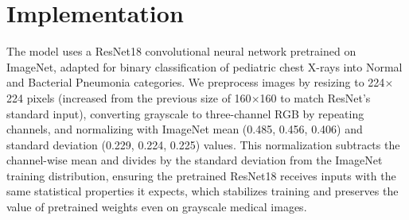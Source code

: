 \documentclass[11pt]{article}
\begin{document}





\section{Implementation}



The model uses a ResNet18 convolutional neural network pretrained on ImageNet, adapted for binary classification of pediatric chest X-rays into Normal and Bacterial Pneumonia categories. We preprocess images by resizing to 224$\times$224 pixels (increased from the previous size of 160$\times$160 to match ResNet's standard input), converting grayscale to three-channel RGB by repeating channels, and normalizing with ImageNet mean (0.485, 0.456, 0.406) and standard deviation (0.229, 0.224, 0.225) values. This normalization subtracts the channel-wise mean and divides by the standard deviation from the ImageNet training distribution, ensuring the pretrained ResNet18 receives inputs with the same statistical properties it expects, which stabilizes training and preserves the value of pretrained weights even on grayscale medical images.
\end{document}

